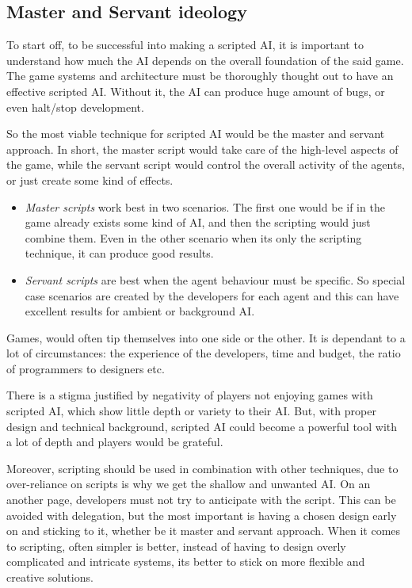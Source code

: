 \documentclass[a4paper, 12pt]{book}
\begin{document}
\subsection{Master and Servant ideology}

To start off, to be successful into making a scripted AI, it is important to understand how much the AI depends on the overall foundation of the said game. The game systems and architecture must be thoroughly thought out to have an effective scripted AI. Without it, the AI can produce huge amount of bugs, or even halt/stop development.

So the most viable technique for scripted AI would be the master and servant approach. In short, the master script would take care of the high-level aspects of the game, while the servant script would control the overall activity of the agents, or just create some kind of effects.  

\begin{itemize}
    \item \emph{Master scripts} work best in two scenarios. The first one would be if in the game already exists some kind of AI, and then the scripting would just combine them. Even in the other scenario when its only the scripting technique, it can produce good results.
    \item \emph{Servant scripts} are best when the agent behaviour must be specific. So special case scenarios are created by the developers for each agent and this can have excellent results for ambient or background AI.
\end{itemize}

Games, would often tip themselves into one side or the other. It is dependant to a lot of circumstances: the experience of the developers, time and budget, the ratio of programmers to designers etc.

There is a stigma justified by negativity of players not enjoying games with scripted AI, which show little depth or variety to their AI. But, with proper design and technical background, scripted AI could become a powerful tool with a lot of depth and players would be grateful.

Moreover, scripting should be used in combination with other techniques, due to over-reliance on scripts is why we get the shallow and unwanted AI. On an another page, developers must not try to anticipate with the script. This can be avoided with delegation, but the most important is having a chosen design early on and sticking to it, whether be it master and servant approach. When it comes to scripting, often simpler is better, instead of having to design overly complicated and intricate systems, its better to stick on more flexible and creative solutions.
\end{document}
